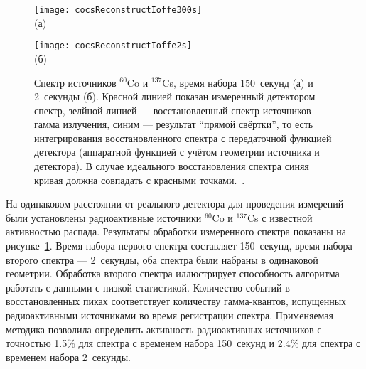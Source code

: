 \begin{figure}[ht!]
    \begin{minipage}[b][][b]{0.48\linewidth}\centering
      \texttt{[image: cocsReconstructIoffe300s]} \\ (а) \\
    \end{minipage}
    \hfill
    \begin{minipage}[b][][b]{0.48\linewidth}\centering
      \texttt{[image: cocsReconstructIoffe2s]} \\ (б) \\
    \end{minipage}
    \vspace{5mm}
    \caption{ Спектр источников ${}^{60}$Co и ${}^{137}$Cs, время набора 150~секунд (а) и 2~секунды (б). Красной линией показан измеренный детектором спектр, зелйной линией --- восстановленный спектр источников гамма излучения, синим --- результат ``прямой свёртки'', то есть интегрирования восстановленного спектра с передаточной функцией детектора (аппаратной функцией с учётом геометрии источника и детектора). В случае идеального восстановления спектра синяя кривая должна совпадать с красными точками.~\cite{Shevelev2013}. }
    \label{fig:cocsReconstructIoffe}
\end{figure}

На одинаковом расстоянии от реального детектора для проведения измерений были установлены радиоактивные источники ${}^{60}$Co и ${}^{137}$Cs с известной активностью распада. Результаты обработки измеренного спектра показаны на рисунке~\ref{fig:cocsReconstructIoffe}. Время набора первого спектра составляет 150~секунд, время набора второго спектра --- 2~секунды, оба спектра были набраны в одинаковой геометрии. Обработка второго спектра иллюстрирует способность алгоритма работать с данными с низкой статистикой. Количество событий в восстановленных пиках соответствует количеству гамма-квантов, испущенных радиоактивными источниками во время регистрации спектра. Применяемая методика позволила определить активность радиоактивных источников с точностью 1.5\% для спектра с временем набора 150~секунд и 2.4\% для спектра с временем набора 2~секунды.~\cite{Shevelev2013}

